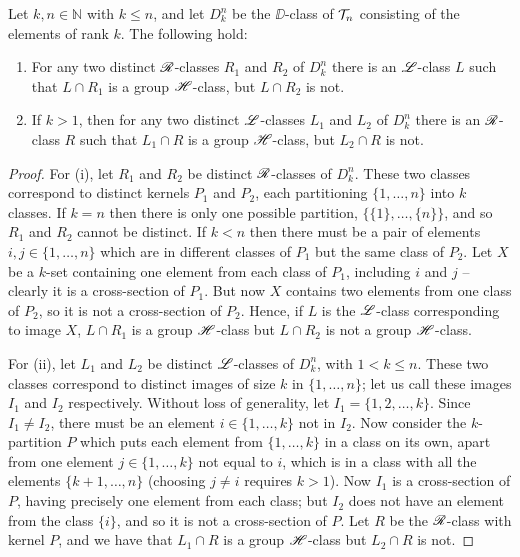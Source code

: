 \begin{lemma}
  \label{lem:dk-hclasses}
  Let $k,n \in \mathbb{N}$ with $k \leq n$, and let $D_k^n$ be the $\DD$-class
  of $\mathcal{T}_n$ consisting of the elements of rank $k$.  The following hold:
  \begin{enumerate}[\rm(i)]
  \item For any two distinct $\mathrel{\mathscr{R}}$-classes $R_1$ and $R_2$ of $D_k^n$ there is an
    $\mathrel{\mathscr{L}}$-class $L$ such that $L \cap R_1$ is a group $\mathrel{\mathscr{H}}$-class, but
    $L \cap R_2$ is not.
  \item If $k > 1$, then for any two distinct $\mathrel{\mathscr{L}}$-classes $L_1$ and $L_2$ of
    $D_k^n$ there is an $\mathrel{\mathscr{R}}$-class $R$ such that $L_1 \cap R$ is a group
    $\mathrel{\mathscr{H}}$-class, but $L_2 \cap R$ is not.
  \end{enumerate}
  \begin{proof}
    For (i), let $R_1$ and $R_2$ be distinct $\mathrel{\mathscr{R}}$-classes of $D_k^n$.  These two
    classes correspond to distinct kernels $P_1$ and $P_2$, each partitioning
    $\{1, \dots, n\}$ into $k$ classes.  If $k=n$ then there is only one
    possible partition, $\big\{\{1\}, \dots, \{n\}\big\}$, and so $R_1$ and
    $R_2$ cannot be distinct.  If $k<n$ then there must be a pair of elements
    $i,j \in \{1,\dots, n\}$ which are in different classes of $P_1$ but the
    same class of $P_2$.  Let $X$ be a $k$-set containing one element from each
    class of $P_1$, including $i$ and $j$ -- clearly it is a cross-section of
    $P_1$.  But now $X$ contains two elements from one class of $P_2$, so it is
    not a cross-section of $P_2$.  Hence, if $L$ is the $\mathrel{\mathscr{L}}$-class
    corresponding to image $X$, $L \cap R_1$ is a group $\mathrel{\mathscr{H}}$-class but
    $L \cap R_2$ is not a group $\mathrel{\mathscr{H}}$-class.

    For (ii), let $L_1$ and $L_2$ be distinct $\mathrel{\mathscr{L}}$-classes of $D_k^n$, with
    $1 < k \leq n$.  These two classes correspond to distinct images of size $k$
    in $\{1, \ldots, n\}$; let us call these images $I_1$ and $I_2$ respectively.
    Without loss of generality, let $I_1 = \{1, 2, \dots, k\}$.  Since
    $I_1 \neq I_2$, there must be an element $i \in \{1, \ldots, k\}$ not in $I_2$.
    Now consider the $k$-partition $P$ which puts each element from
    $\{1, \ldots, k\}$ in a class on its own, apart from one element
    $j \in \{1, \ldots, k\}$ not equal to $i$, which is in a class with all the
    elements $\{k+1, \ldots, n\}$ (choosing $j \neq i$ requires $k > 1$).  Now
    $I_1$ is a cross-section of $P$, having precisely one element from each
    class; but $I_2$ does not have an element from the class $\{i\}$, and so it
    is not a cross-section of $P$.  Let $R$ be the $\mathrel{\mathscr{R}}$-class with kernel $P$,
    and we have that $L_1 \cap R$ is a group $\mathrel{\mathscr{H}}$-class but $L_2 \cap R$ is
    not.
  \end{proof}
\end{lemma}

